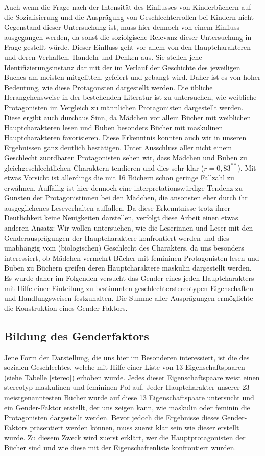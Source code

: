 Auch wenn die Frage nach der Intensität des Einflusses von Kinderbüchern
auf die Sozialisierung und die Ausprägung von Geschlechterrollen bei
Kindern nicht Gegenstand dieser Untersuchung ist, muss hier dennoch von
einem Einfluss ausgegangen werden, da sonst die soziolgische Relevanz
dieser Untersuchung in Frage gestellt würde. Dieser Einfluss geht vor
allem von den Hauptcharakteren und deren Verhalten, Handeln und Denken
aus. Sie stellen jene Identifizierungsinstanz dar mit der im Verlauf der
Geschichte des jeweiligen Buches am meisten mitgelitten, gefeiert und
gebangt wird. Daher ist es von hoher Bedeutung, wie diese Protagonsten
dargestellt werden. Die übliche Herangehensweise in der bestehenden
Literatur ist zu untersuchen, wie weibliche Protagonisten im Vergleich
zu männlichen Protagonisten dargestellt werden. Diese ergibt auch
durchaus Sinn, da Mädchen vor allem Bücher mit weiblichen
Hauptcharakteren lesen und Buben besonders Bücher mit maskulinen
Hauptcharakteren favorisieren. Diese Erkenntnis konnten auch wir in
unseren Ergebnissen ganz deutlich bestätigen. Unter Ausschluss aller
nicht einem Geschlecht zuordbaren Protagonisten sehen wir, dass Mädchen
und Buben zu gleichgeschlechtlichen Charaktern tendieren und dies sehr
klar ($r= 0{,}83^{**}$). Mit etwas Vorsicht ist allerdings die mit 16
Büchern schon geringe Fallzahl zu erwähnen. Auffällig ist hier dennoch
eine interpretationswürdige Tendenz zu Gunsten der Protagonistinnen bei
den Mädchen, die ansonsten eher durch ihr ausgeglichenes Leseverhalten
auffallen. Da diese Erkenntnisse trotz ihrer Deutlichkeit keine
Neuigkeiten darstellen, verfolgt diese Arbeit einen etwas anderen
Ansatz: Wir wollen untersuchen, wie die Leserinnen und Leser mit den
Genderausprägungen der Hauptcharaktere konfrontiert werden und dies
unabhängig vom (biologischen) Geschlecht des Charakters, da uns
besonders interessiert, ob Mädchen vermehrt Bücher mit femininen
Protagonisten lesen und Buben zu Büchern greifen deren Hauptcharaktere
maskulin dargestellt werden. Es wurde daher im Folgenden versucht das
Gender eines jeden Hauptcharakters mit Hilfe einer Einteilung zu
bestimmten geschlechterstereotypen Eigenschaften und Handlungsweisen
festzuhalten. Die Summe aller Ausprägungen ermöglichte die Konstruktion
eines Gender-Faktors.

\subsection{Bildung des Genderfaktors}

Jene Form der Darstellung, die uns hier im Besonderen interessiert, ist
die des sozialen Geschlechtes, welche mit Hilfe einer Liste von 13
Eigenschaftspaaren (siehe Tabelle \ref{stereo}) erhoben wurde. Jedes
dieser Eigenschaftspaare weist einen stereotyp maskulinen und femininen
Pol auf. Jeder Hauptcharakter unserer 23 meistgenanntesten Bücher wurde
auf diese 13 Eigenschaftspaare untersucht und ein Gender-Faktor
erstellt, der uns zeigen kann, wie maskulin oder feminin die
Protagonisten dargestellt werden. Bevor jedoch die Ergebnisse dieses
Gender-Faktors präsentiert werden können, muss zuerst klar sein wie
dieser erstellt wurde. Zu diesem Zweck wird zuerst erklärt, wer die
Hauptprotagonisten der Bücher sind und wie diese mit der
Eigenschaftenliste konfrontiert wurden.

